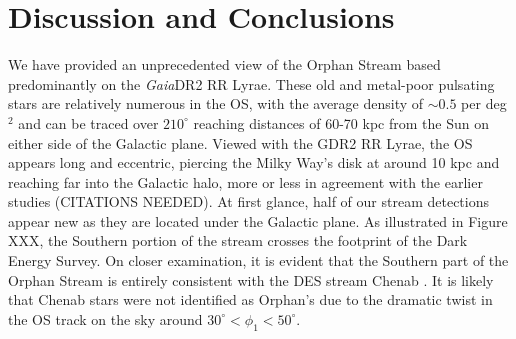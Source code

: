 \documentclass[a4paper,useAMS,usenatbib]{mnras}
\newcommand{\Gaia}{{\it Gaia}}
\begin{document}
\section{Discussion and Conclusions}
\label{sec:conc}

We have provided an unprecedented view of the Orphan Stream based
predominantly on the \Gaia DR2 RR Lyrae. These old and metal-poor
pulsating stars are relatively numerous in the OS, with the average
density of $\sim0.5$ per deg$^2$ and can be traced over $210^{\circ}$
reaching distances of 60-70 kpc from the Sun on either side of the
Galactic plane. Viewed with the GDR2 RR Lyrae, the OS appears long and
eccentric, piercing the Milky Way's disk at around 10 kpc and reaching
far into the Galactic halo, more or less in agreement with the earlier
studies (CITATIONS NEEDED). At first glance, half of our stream
detections appear new as they are located under the Galactic plane. As
illustrated in Figure XXX, the Southern portion of the stream crosses
the footprint of the Dark Energy Survey. On closer examination, it is
evident that the Southern part of the Orphan Stream is entirely
consistent with the DES stream Chenab \citep[see][]{Shipp2018}. It is
likely that Chenab stars were not identified as Orphan's due to the
dramatic twist in the OS track on the sky around
$30^{\circ}<\phi_1<50^{\circ}$.
\end{document}
